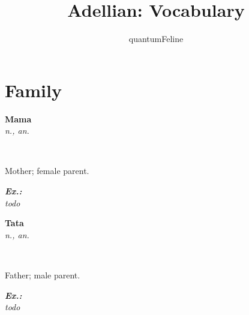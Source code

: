 \documentclass[12pt]{article}
\newcommand{\defword}[4]{
	\colorbox{light-gray}{
		\parbox{5in}{
			\textbf{#1} \\
				  \emph{#2} \\
		  }
	} \\
	\colorbox{lighter-gray}{
		\parbox{5in}{
			#3

			\textbf{\emph{Ex.:}}\\
			\emph{#4}
		  }
	}
}
\newcommand{\defnoun}[4]{
	\defword {#1}{n., #2}{#3}{#4}
}
\begin{document}
	\title{Adellian: Vocabulary}
	\author{quantumFeline}
	\maketitle

	\section{Family}

	\defnoun {Mama}
			 {an.}
		 	 {Mother; female parent.}
		 	 {todo}

	\defnoun {Tata}
			 {an.}
		 	 {Father; male parent.}
		 	 {todo}
\end{document}
